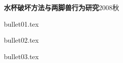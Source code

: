 \begin {rProject}{\bf 水杯破坏方法与两脚兽行为研究}{2008秋}{}{}
\item {bullet01.tex}
\item {bullet02.tex}
\item {bullet03.tex}
\end {rProject}
